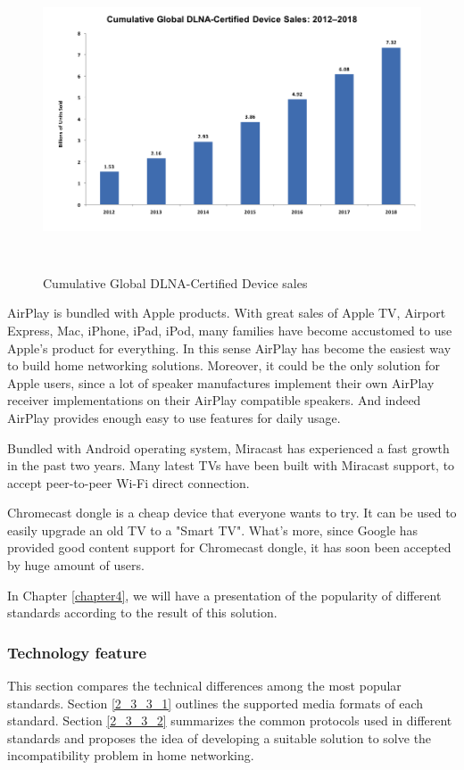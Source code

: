 \begin{figure}[htb] 
\centering \includegraphics[height=9cm]{charts/dlna_market} 
\caption{Cumulative Global DLNA-Certified Device sales \label{dlna_market}} 
\end{figure}
 
AirPlay is bundled with Apple products. With great sales of Apple TV, Airport Express, 
Mac, iPhone, iPad, iPod, many families have become accustomed to use Apple's product for everything. In this sense AirPlay has become the easiest way to build home networking solutions. Moreover, it could be the only solution for Apple users, since a lot of speaker manufactures implement their own AirPlay receiver implementations on their AirPlay compatible speakers. And indeed AirPlay provides enough easy to use features for daily usage.

Bundled with Android operating system, Miracast has experienced a fast growth in 
the past two years. Many latest TVs have been built with Miracast support, to accept peer-to-peer Wi-Fi direct connection.

Chromecast dongle is a cheap device that everyone wants to try. It can be used to easily upgrade an old TV to a "Smart TV".  What's more, since Google has provided good content support for Chromecast dongle, it has soon been accepted by huge amount of users.

In Chapter \ref{chapter4}, we will have a presentation of the popularity of
different standards according to the result of this solution.
\subsubsection{Technology feature\label{2_3_3}} 
This section compares the technical differences among the most popular standards. Section \ref{2_3_3_1} outlines the supported media formats of each standard. Section \ref{2_3_3_2} summarizes the common protocols used in different standards and proposes the idea of developing a suitable solution to solve the incompatibility problem in home networking.
